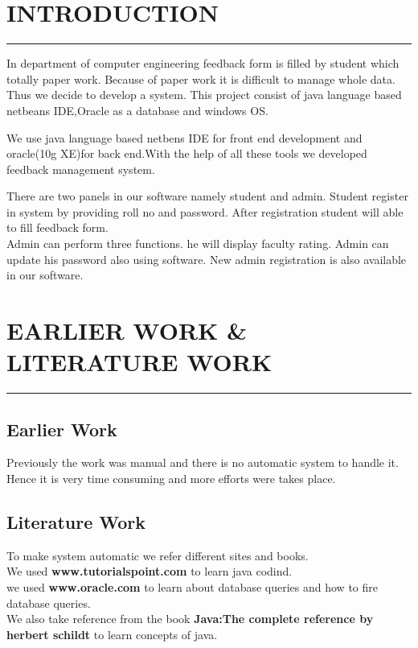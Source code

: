 \documentclass[12 pt,a4paper]{report}
\begin{document}
\chapter{INTRODUCTION}
\begin{center}
\rule{\textwidth}{2 pt}
\justify
In department of computer engineering feedback form is filled by student which totally paper work. Because of paper work it is difficult to manage whole data. Thus we decide to develop a system.
This project consist of java language based netbeans IDE,Oracle as a database and windows OS.\par
\justify
We use java language based netbens IDE for front end development and oracle(10g XE)for back end.With the help of all these tools we developed feedback management system.\par
\justify
There are two panels in our software namely student and admin. Student register in system by providing roll no and password. After registration student will able to fill feedback form.\\
Admin can perform three functions. he will display faculty rating. Admin can update his password also using software. New admin registration is also available in our software.
\end{center}

\chapter{EARLIER WORK \& LITERATURE WORK}
\begin{center}
\rule{\textwidth}{2 pt}
\justify
\section{Earlier Work}
Previously the work was manual and there is no automatic system to handle it. Hence it is very time consuming and more efforts were takes place. 
\section{Literature Work}
\justify
To make system automatic we refer different sites and books.\\
We used \textbf{www.tutorialspoint.com} to learn java codind.\\
we used \textbf{www.oracle.com} to learn about database queries and how to fire database queries.\\
We also take reference from the book \textbf{Java:The complete reference by herbert schildt} to learn concepts of java.

\end{center}
\end{document}
